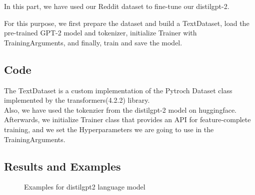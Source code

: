 \documentclass[12pt, a4paper]{article}
\begin{document}
\vspace{5mm}
In this part, we have used our Reddit dataset to fine-tune our distilgpt-2.

For this purpose, we first prepare the dataset and build a TextDataset, load the pre-trained GPT-2 model and tokenizer, initialize Trainer with TrainingArguments, and finally, train and save the model. 

\subsection*{Code}
The TextDataset is a custom implementation of the Pytroch Dataset class implemented by the transformers(4.2.2) library.
\\Also, we have used the tokenzier from the distilgpt-2 model on huggingface.
\\Afterwards, we initialize Trainer class that provides an API for feature-complete training, and we set the Hyperparameters we are going to use in the TrainingArguments.

\subsection*{Results and Examples}
\begin{figure}[H]
	\caption{Examples for distilgpt2 language model}
	\label{finetune-lm_examples.png}
\end{figure}
%


\newpage
\end{document}
